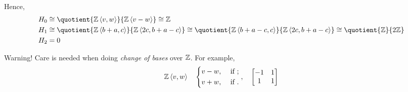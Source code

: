 \begin{eg}
\[	\]
	Hence,
	\[
		\begin{split}
			H_0 &\cong \quotient{\mathbb{\MakeUppercase{z}} \left< v, w \right> }{\mathbb{\MakeUppercase{z}} \left< v - w \right> } \cong \mathbb{\MakeUppercase{z}}\\
			H_1 &\cong \quotient{\mathbb{\MakeUppercase{z}} \left< b + a, c \right> }{\mathbb{\MakeUppercase{z}} \left< 2c, b+a-c \right> } \cong \quotient{\mathbb{\MakeUppercase{z}} \left< b + a - c, c \right> }{\mathbb{\MakeUppercase{z}} \left< 2c, b+a-c \right> } \cong \quotient{\mathbb{\MakeUppercase{z}} }{2\mathbb{\MakeUppercase{z}}}\\
			H_2 &= 0\\
		\end{split}
	\]
\end{eg}

\begin{remark}
	Warning! Care is needed when doing \emph{change of bases} over \(\mathbb{\MakeUppercase{z}} \). For example,
	\[
		\mathbb{\MakeUppercase{z}} \left< v, w \right> \quad \begin{dcases}
			v - w, & \text{ if }  ; \\
			v + w, & \text{ if }  .
		\end{dcases},\quad
		\begin{bmatrix}
			-1 & 1 \\
			1  & 1 \\
		\end{bmatrix}
	\]
\end{remark}